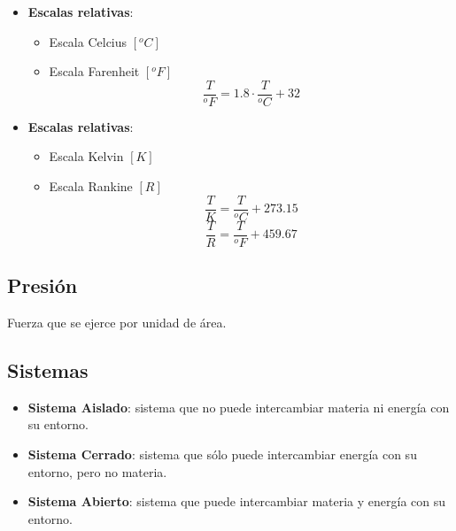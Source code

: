         \begin{multicols}{2}

            \begin{itemize}
                \item \textbf{Escalas relativas}:
                \begin{itemize}
                    \item Escala Celcius \([{}^{o}C]\)
                    \item Escala Farenheit \([{}^{o}F]\)
                    \begin{equation}
                        \frac{T}{{}^{o}F} = 1.8 \cdot \frac{T}{{}^{o}C} + 32
                    \end{equation}
                \end{itemize}
                \hspace{2cm}
                
                \item \textbf{Escalas relativas}:
                \begin{itemize}
                    \item Escala Kelvin \([K]\)
                    \item Escala Rankine \([R]\)
                    \begin{equation}
                        \frac{T}{K} = \frac{T}{{}^{o}C} + 273.15
                    \end{equation}
                    \begin{equation}
                        \frac{T}{R} = \frac{T}{{}^{o}F} + 459.67
                    \end{equation}
                \end{itemize}
            \end{itemize}
        \end{multicols}
    
    \subsection{Presión}
    
    Fuerza que se ejerce por unidad de área.

    \subsection{Sistemas}

    \begin{itemize}
        \item \textbf{Sistema Aislado}: sistema que no puede intercambiar materia ni energía con su entorno.
        \item \textbf{Sistema Cerrado}: sistema que sólo puede intercambiar energía con su entorno, pero no materia.
        \item \textbf{Sistema Abierto}: sistema que puede intercambiar materia y energía con su entorno.
    \end{itemize}

